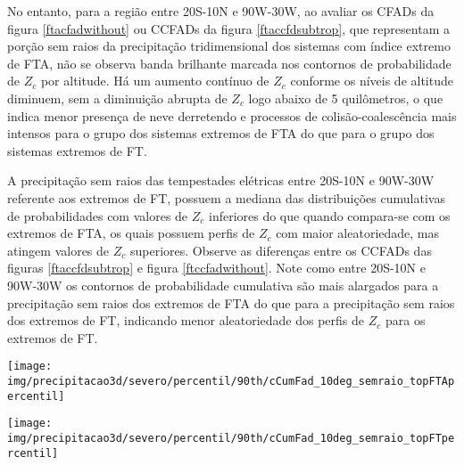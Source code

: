 No entanto, para a região entre 20S-10N e 90W-30W, ao avaliar os CFADs da figura \ref{ftacfadwithout} ou CCFADs da figura \ref{ftaccfdsubtrop}, que representam a porção sem raios da precipitação tridimensional dos sistemas com índice extremo de FTA, não se observa banda brilhante marcada nos contornos de probabilidade de $Z_c$ por altitude. Há um aumento contínuo de $Z_c$ conforme os níveis de altitude diminuem, sem a diminuição abrupta de $Z_c$ logo abaixo de 5 quilômetros, o que indica menor presença de neve derretendo e processos de colisão-coalescência mais intensos para o grupo dos sistemas extremos de FTA do que para o grupo dos sistemas extremos de FT. 


A precipitação sem raios das tempestades elétricas entre 20S-10N e 90W-30W referente aos extremos de FT, possuem a mediana das distribuições cumulativas de probabilidades com valores de $Z_c$ inferiores do que quando compara-se com os extremos de FTA, os quais possuem perfis de $Z_c$ com maior aleatoriedade, mas atingem valores de $Z_c$ superiores. Observe as diferenças entre os CCFADs das figuras \ref{ftaccfdsubtrop} e figura \ref{ftccfadwithout}. Note como entre 20S-10N e 90W-30W os contornos de probabilidade cumulativa são mais alargados para a precipitação sem raios dos extremos de FTA do que para a precipitação sem raios dos extremos de FT, indicando menor aleatoriedade dos perfis de $Z_c$ para os extremos de FT.

\begin{sidewaysfigure}%
  \centering
  \texttt{[image: img/precipitacao3d/severo/percentil/90th/cCumFad\_10deg\_semraio\_topFTApercentil]}
  \caption{CCFDs para os extremos de FTA. Porção da precipitação sem raios.}
  \label{ftaccfdsubtrop}   
\end{sidewaysfigure} 

\begin{sidewaysfigure}%
  \centering
  \texttt{[image: img/precipitacao3d/severo/percentil/90th/cCumFad\_10deg\_semraio\_topFTpercentil]}
  \caption{CCFDs para os extremos de FT. Porção da precipitação sem raios.}
  \label{ftccfadwithout}   
\end{sidewaysfigure} 




